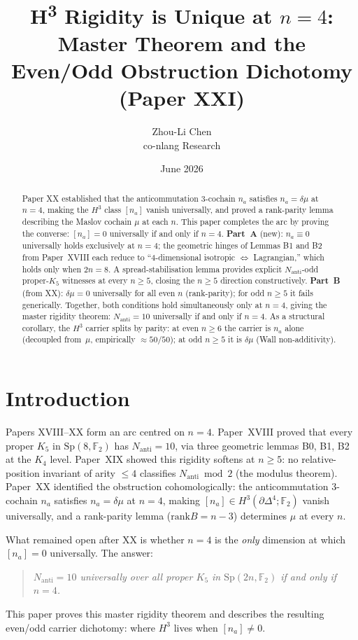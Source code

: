 \documentclass[11pt,a4paper]{article}
\title{\textbf{H\textsuperscript{3} Rigidity is Unique at $n=4$:
  Master Theorem and the Even/Odd Obstruction Dichotomy}\\[4pt]
\large (Paper XXI)}
\author{Zhou-Li Chen\\[2pt]\small co-nlang Research}
\date{June 2026}
\newcommand{\Nanti}{N_{\mathrm{anti}}}
\newcommand{\Sp}{\mathrm{Sp}}
\newcommand{\rank}{\mathrm{rank}}
\newcommand{\F}{\mathbb{F}}
\theoremstyle{plain}
\theoremstyle{definition}
\theoremstyle{remark}
\begin{document}
\maketitle

\begin{abstract}
Paper XX established that the anticommutation 3-cochain $n_a$ satisfies
$n_a = \delta\mu$ at $n=4$, making the $H^3$ class $[n_a]$ vanish universally,
and proved a rank-parity lemma describing the Maslov cochain $\mu$ at each $n$.
This paper completes the arc by proving the converse: $[n_a] = 0$
universally if and only if $n = 4$.
\textbf{Part~A} (new): $n_a \equiv 0$ universally holds exclusively at $n=4$;
the geometric hinges of Lemmas B1 and B2 from Paper~XVIII each reduce to
``4-dimensional isotropic $\Leftrightarrow$ Lagrangian,'' which holds only
when $2n = 8$.
A spread-stabilisation lemma provides explicit $\Nanti$-odd proper-$K_5$
witnesses at every $n \geq 5$, closing the $n \geq 5$ direction
constructively.
\textbf{Part~B} (from XX): $\delta\mu = 0$ universally for all even $n$
(rank-parity); for odd $n \geq 5$ it fails generically.
Together, both conditions hold simultaneously only at $n=4$, giving
the master rigidity theorem: $\Nanti = 10$ universally if and only if $n=4$.
As a structural corollary, the $H^3$ carrier splits by parity:
at even $n \geq 6$ the carrier is $n_a$ alone (decoupled from~$\mu$,
empirically $\approx 50/50$); at odd $n \geq 5$ it is $\delta\mu$
(Wall non-additivity).
\end{abstract}

\section{Introduction}

Papers XVIII--XX form an arc centred on $n = 4$.
Paper~XVIII \cite{PaperXVIII} proved that every proper $K_5$ in $\Sp(8,\F_2)$
has $\Nanti = 10$, via three geometric lemmas B0, B1, B2 at the $K_4$ level.
Paper~XIX \cite{PaperXIX} showed this rigidity softens at $n \geq 5$:
no relative-position invariant of arity $\leq 4$ classifies $\Nanti \bmod 2$
(the modulus theorem).
Paper~XX \cite{PaperXX} identified the obstruction cohomologically:
the anticommutation 3-cochain $n_a$ satisfies $n_a = \delta\mu$ at $n=4$,
making $[n_a] \in H^3(\partial\Delta^4;\F_2)$ vanish universally, and a
rank-parity lemma ($\rank B = n-3$) determines $\mu$ at every $n$.

What remained open after XX is whether $n = 4$ is the \emph{only}
dimension at which $[n_a] = 0$ universally.
The answer:
\begin{quote}
\emph{$\Nanti = 10$ universally over all proper $K_5$ in $\Sp(2n,\F_2)$
if and only if $n = 4$.}
\end{quote}
This paper proves this master rigidity theorem and describes the resulting
even/odd carrier dichotomy: where $H^3$ lives when $[n_a] \neq 0$.
\end{document}
